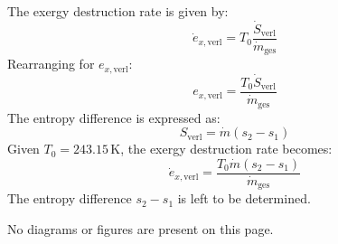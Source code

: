 The exergy destruction rate is given by:  
\[
\dot{e}_{x,\text{verl}} = T_0 \frac{\dot{S}_{\text{verl}}}{\dot{m}_{\text{ges}}}
\]  
Rearranging for \( e_{x,\text{verl}} \):  
\[
e_{x,\text{verl}} = \frac{T_0 \dot{S}_{\text{verl}}}{\dot{m}_{\text{ges}}}
\]  
The entropy difference is expressed as:  
\[
S_{\text{verl}} = \dot{m} \left( s_2 - s_1 \right)
\]  
Given \( T_0 = 243.15 \, \text{K} \), the exergy destruction rate becomes:  
\[
\dot{e}_{x,\text{verl}} = \frac{T_0 \dot{m} \left( s_2 - s_1 \right)}{\dot{m}_{\text{ges}}}
\]  
The entropy difference \( s_2 - s_1 \) is left to be determined.  

No diagrams or figures are present on this page.